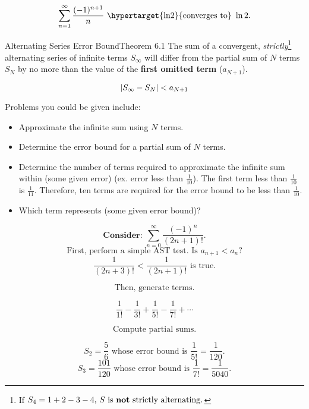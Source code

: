 \documentclass[10pt]{article}
\theoremstyle{definition}
\DeclarePairedDelimiter{\abs}{\lvert}{\rvert}
\begin{document}
\[\sum_{n=1}^{\infty} \frac{(-1)^{n+1}}{n} \text{ \hypertarget{ln2}{converges to} } \ln 2.\]

\vspace{0.5cm}

\begin{theorem}{Alternating Series Error Bound}{Theorem 6.1}
\hypertarget{Error Bound}{The sum of a convergent, \emph{strictly}\footnote[1]{If $S_4=1+2-3-4 \text{, $S$ is \textbf{not} strictly alternating.}$} alternating series of infinite terms $S_\infty$ will differ from the partial sum of $N$ terms $S_N$ by no more than the value of the \textbf{first omitted term} ($a_{N+1}$).}


\[\abs*{S_\infty-S_N}<a_{N+1}\]

\end{theorem}


\vspace{0.5cm}

Problems you could be given include:
\begin{itemize}
    \item Approximate the infinite sum using $N$ terms.
    \item Determine the error bound for a partial sum of $N$ terms.
    \item Determine the number of terms required to approximate the infinite sum within (some given error) (ex. error less than $\frac{1}{10}$). The first term less than $\frac{1}{10}$ is $\frac{1}{11}$. 
    \vspace{0.1cm}
    Therefore, ten terms are required for the error bound to be less than $\frac{1}{10}$.
    \item Which term represents (some given error bound)?
\end{itemize}

\vspace{0.5 cm}


\[ \textbf{Consider: } \sum_{n=0}^{\infty} \frac{(-1)^n}{(2n+1)!}.\] 
\[\text{First, perform a simple AST test. Is } a_{n+1}<a_n?\]
\[\frac{1}{(2n+3)!}<\frac{1}{(2n+1)!} \text{ is true.}\]

\[\text{Then, generate terms.}\]


\[\frac{1}{1!} - \frac{1}{3!} + \frac{1}{5!} - \frac{1}{7!} + \cdots\]

\[\text{Compute partial sums.}\]

\[S_2=\frac{5}{6} \text{ whose error bound is } \frac{1}{5!}=\frac{1}{120}.\]
\[S_3=\frac{101}{120} \text{ whose error bound is } \frac{1}{7!}=\frac{1}{5040}.\]
\end{document}
